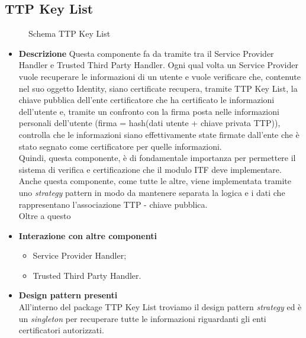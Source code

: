 \subsection{TTP Key List}
\begin{figure}[!h]
	\centering
	\caption{Schema TTP Key List}
\end{figure}
\begin{itemize}
	\item \textbf{Descrizione}
	Questa componente fa da tramite tra il Service Provider Handler e Trusted Third Party Handler.
	Ogni qual volta un Service Provider vuole recuperare le informazioni di un utente e vuole verificare che, contenute nel suo oggetto Identity, siano certificate recupera, tramite TTP Key List, la chiave pubblica dell'ente certificatore che ha certificato le informazioni dell'utente e, tramite un confronto con la firma posta nelle informazioni personali dell'utente (firma = hash(dati utente + chiave privata \gls{TTP})), controlla che le informazioni siano effettivamente state firmate dall'ente che è stato segnato come certificatore per quelle informazioni.\\
	Quindi, questa componente, è di fondamentale importanza per permettere il sistema di verifica e certificazione che il modulo \gls{ITF} deve implementare.\\
	Anche questa componente, come tutte le altre, viene implementata tramite uno \textit{strategy} pattern in modo da mantenere separata la logica e i dati che rappresentano l'associazione \gls{TTP} - chiave pubblica.\\
	Oltre a questo
	\item \textbf{Interazione con altre componenti}
	\begin{itemize}
		\item Service Provider Handler;
		\item Trusted Third Party Handler.
	\end{itemize}
	\item \textbf{Design pattern presenti}\\
	All'interno del package TTP Key List troviamo il design pattern \textit{strategy} ed è un \textit{singleton} per recuperare tutte le informazioni riguardanti gli enti certificatori autorizzati.
\end{itemize}
